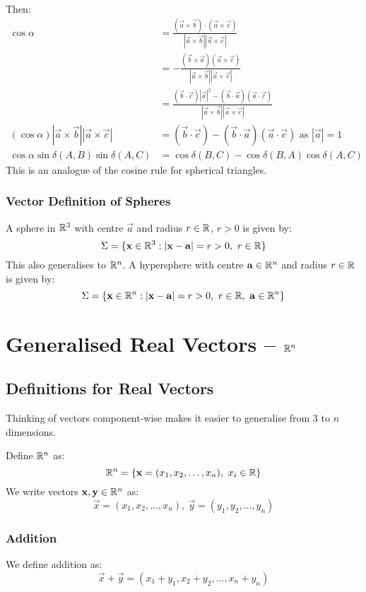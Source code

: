 \documentclass[../main.tex]{subfiles}
\begin{document}
Then:
\begin{align*}
  \cos \alpha &= \frac{(\vec{a} \times \vec{b}) \cdot (\vec{a} \times \vec{c})}{|\vec{a} \times \vec{b}| |\vec{a} \times \vec{c}|} \\
               &= - \frac{(\vec{b} \times \vec{a})(\vec{a} \times \vec{c})}{|\vec{a} \times \vec{b}||\vec{a} \times \vec{c}|} \\
               &= \frac{(\vec{b} \cdot \vec{c})|\vec{a}|^2 - (\vec{b} \cdot \vec{a})(\vec{a} \cdot \vec{c})}{|\vec{a} \times \vec{b}||\vec{a} \times \vec{c}|} \\
  (\cos \alpha)|\vec{a} \times \vec{b}||\vec{a} \times \vec{c}| &= (\vec{b} \cdot \vec{c}) - (\vec{b} \cdot \vec{a})(\vec{a} \cdot \vec{c}) \text{ as $|\vec{a}| = 1$} \\
  \cos \alpha \sin \delta(A, B) \sin \delta(A, C) &= \cos \delta(B, C) - \cos \delta(B, A) \cos \delta(A, C)
\end{align*}
This is an analogue of the cosine rule for spherical triangles.

\subsubsection{Vector Definition of Spheres}
A sphere in $\mathbb{R}^3$ with centre $\vec{a}$ and radius $r \in \mathbb{R}$, $r > 0$ is given by:
\[
  \Sigma=\{\boldsymbol{\mathbf{x}} \in \mathbb{R}^3 : |\boldsymbol{\mathbf{x}} - \boldsymbol{\mathbf{a}}| = r > 0,\ r \in \mathbb{R}\}
\]
This also generalises to $\mathbb{R}^{n}$.
A hypersphere with centre $\boldsymbol{\mathbf{a}} \in \mathbb{R}^{n}$ and radius $r \in \mathbb{R}$ is given by:
\[
  \Sigma =\{\boldsymbol{\mathbf{x}} \in \mathbb{R}^{n} : |\boldsymbol{\mathbf{x}} - \boldsymbol{\mathbf{a}}| = r > 0,\ r \in \mathbb{R},\ \boldsymbol{\mathbf{a}} \in \mathbb{R}^{n}\}
\]
\section{Generalised Real Vectors\texorpdfstring{ -- $\mathbb{R}^{n}$}{}}
\label{generalisedReal}
\subsection{Definitions for Real Vectors}
Thinking of vectors component-wise makes it easier to generalise from 3 to $n$ dimensions.

Define $\mathbb{R}^{n}$ as:
\[
  \R^{n} = \{\vec{x} = (x_1, x_2, \ldots, x_n),\ x_i \in \R\}
\]
We write vectors $\boldsymbol{\mathbf{x}}, \boldsymbol{\mathbf{y}} \in \mathbb{R}^{n}$ as:
\[
  \vec{x} = (x_1, x_2, \ldots, x_n),\ \vec{y} = (y_1, y_2, \ldots, y_n)
\]
\subsubsection{Addition}
We define addition as:
\[
  \vec{x} + \vec{y} = (x_1 + y_1, x_2 + y_2, \ldots, x_n + y_n)
\]
\end{document}
